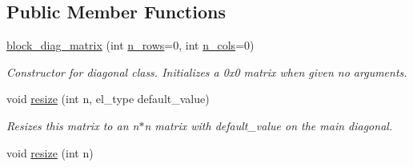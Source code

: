 \subsection*{Public Member Functions}
\begin{DoxyCompactItemize}
\item 
\hyperlink{classblock__diag__matrix_a1591d461af4469b500f856745ed2d05b}{block\+\_\+diag\+\_\+matrix} (int \hyperlink{classblock__diag__matrix_a7d965a63398622c241a1b28b41cd9d18}{n\+\_\+rows}=0, int \hyperlink{classblock__diag__matrix_a09c9b0481acb773a864fa9f320f76cc7}{n\+\_\+cols}=0)\hypertarget{classblock__diag__matrix_a1591d461af4469b500f856745ed2d05b}{}\label{classblock__diag__matrix_a1591d461af4469b500f856745ed2d05b}

\begin{DoxyCompactList}\small\item\em Constructor for diagonal class. Initializes a 0x0 matrix when given no arguments. \end{DoxyCompactList}\item 
void \hyperlink{classblock__diag__matrix_aa2f3ffb9d4e198ab18262b702c79cadb}{resize} (int n, el\+\_\+type default\+\_\+value)\hypertarget{classblock__diag__matrix_aa2f3ffb9d4e198ab18262b702c79cadb}{}\label{classblock__diag__matrix_aa2f3ffb9d4e198ab18262b702c79cadb}

\begin{DoxyCompactList}\small\item\em Resizes this matrix to an n$\ast$n matrix with default\+\_\+value on the main diagonal. \end{DoxyCompactList}\item 
void \hyperlink{classblock__diag__matrix_a12249531555506377724ff14abec6905}{resize} (int n)\hypertarget{classblock__diag__matrix_a12249531555506377724ff14abec6905}{}\label{classblock__diag__matrix_a12249531555506377724ff14abec6905}


\end{DoxyCompactItemize}
